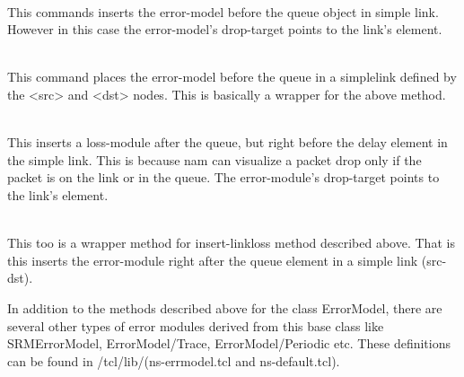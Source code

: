 \begin{flushleft}
\\
This commands inserts the error-model before the queue object in simple link.
However in this case the error-model's drop-target points to the link's
 element.


\\
This command places the error-model before the queue in a simplelink defined
by the <src> and <dst> nodes. This is basically a wrapper for the above method.


\\
This inserts a loss-module after the queue, but right before the delay 
element in the simple link. This is because nam can visualize a packet drop
only if the packet is on the link or in the queue. The error-module's
drop-target points to the link's  element.


\\
This too is a wrapper method for insert-linkloss method described above.
That is this inserts the error-module right after the queue element in a
simple link (src-dst).

In addition to the methods described above for the class ErrorModel, there
are several other types of error modules derived from this base class like
SRMErrorModel, ErrorModel/Trace, ErrorModel/Periodic etc. These definitions
can be found in \ns/tcl/lib/(ns-errmodel.tcl and ns-default.tcl).

\end{flushleft}


